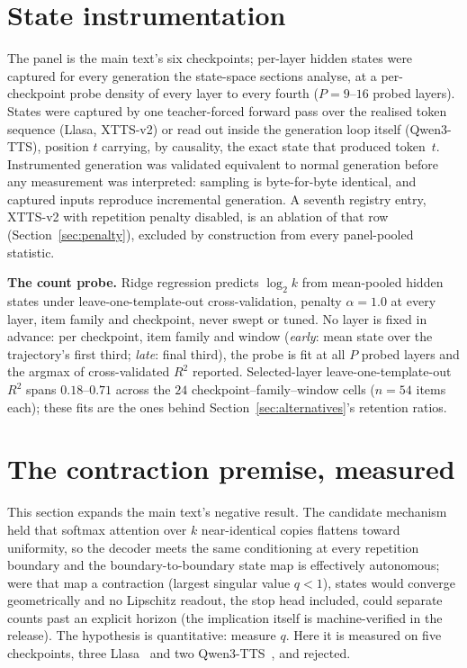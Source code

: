 \section{State instrumentation}
\label{sec:instrumentation}

The panel is the main text's six checkpoints; per-layer hidden states
were captured for every generation the state-space sections analyse, at
a per-checkpoint probe density of every layer to every fourth
($P=9$--$16$ probed layers). States were captured by
one teacher-forced forward pass over the realised token sequence
(Llasa, XTTS-v2) or read out inside the generation loop itself
(Qwen3-TTS), position $t$ carrying, by causality, the exact state that
produced token~$t$. Instrumented generation was validated equivalent to
normal generation before any measurement was interpreted: sampling is
byte-for-byte identical, and captured inputs reproduce incremental
generation. A seventh registry entry, XTTS-v2 with repetition penalty
disabled, is an ablation of that row (Section~\ref{sec:penalty}),
excluded by construction from every panel-pooled statistic.

\noindent\textbf{The count probe.} Ridge regression predicts $\log_2 k$
from mean-pooled hidden states under leave-one-template-out
cross-validation, penalty $\alpha=1.0$ at every layer, item family and
checkpoint, never swept or tuned. No layer is fixed in advance: per
checkpoint, item family and window (\emph{early}: mean state over the
trajectory's first third; \emph{late}: final third), the probe is fit
at all $P$ probed layers and the argmax of cross-validated $R^2$
reported. Selected-layer leave-one-template-out $R^2$ spans
$0.18$--$0.71$ across the $24$ checkpoint--family--window cells
($n{=}54$ items each); these fits are the ones behind
Section~\ref{sec:alternatives}'s retention ratios.

\section{The contraction premise, measured}
\label{sec:contraction}

This section expands the main text's negative result. The candidate
mechanism held that softmax attention over $k$ near-identical copies
flattens toward uniformity, so the decoder meets the same conditioning at
every repetition boundary and the boundary-to-boundary state map is
effectively autonomous; were that map a contraction (largest singular
value $q<1$), states would converge geometrically and no Lipschitz
readout, the stop head included, could separate counts past an explicit
horizon (the implication itself is machine-verified in the release). The hypothesis is quantitative: measure $q$. Here it is measured on
five checkpoints, three Llasa~\cite{ye2025llasa} and two
Qwen3-TTS~\cite{hu2026qwen3tts}, and rejected.

